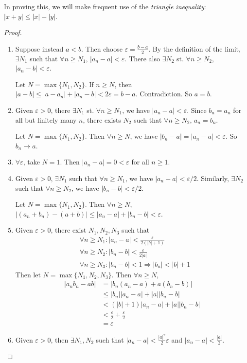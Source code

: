 \documentclass[a4paper]{article}
\begin{document}
In proving this, we will make frequent use of the \emph{triangle inequality}: $|x + y|\leq |x| + |y|$.
\begin{proof}\leavevmode
  \begin{enumerate}
    \item Suppose instead $a < b$. Then choose $\varepsilon = \frac{b - a}{2}$. By the definition of the limit, $\exists N_1$ such that $\forall n\geq N_1$, $|a_n - a| < \varepsilon$. There also $\exists N_2$ st. $\forall n\geq N_2$, $|a_n - b| < \varepsilon$.

      Let $N = \max\{N_1, N_2\}$. If $n\geq N$, then $|a - b| \leq |a - a_n| + |a_n - b| < 2\varepsilon = b - a.$
      Contradiction. So $a = b$.
    \item Given $\varepsilon > 0$, there $\exists N_1$ st. $\forall n\geq N_1$, we have $|a_n - a| < \varepsilon$. Since $b_n = a_n$ for all but finitely many $n$, there exists $N_2$ such that $\forall n\geq N_2$, $a_n = b_n$.

      Let $N = \max\{N_1, N_2\}$. Then $\forall n\geq N$, we have $|b_n - a| = |a_n - a| < \varepsilon$. So $b_n\to a$.
    \item $\forall \varepsilon$, take $N = 1$. Then $|a_n - a| = 0 < \varepsilon$ for all $n \geq 1$.
    \item Given $\varepsilon > 0$, $\exists N_1$ such that $\forall n\geq N_1$, we have $|a_n - a| < \varepsilon/2$. Similarly, $\exists N_2$ such that $\forall n\geq N_2$, we have $|b_n - b| < \varepsilon/2$.

      Let $N = \max\{N_1, N_2\}$. Then $\forall n \geq N$, $|(a_n + b_n) - (a + b)| \leq |a_n - a| + |b_n - b| < \varepsilon$.
    \item Given $\varepsilon > 0$, there exist $N_1, N_2, N_3$ such that
      \begin{align*}
        &\forall n\geq N_1: |a_n - a| < \frac{\varepsilon}{2(|b| + 1)}\\
        &\forall n\geq N_2: |b_n - b| < \frac{\varepsilon}{2|a|}\\
        &\forall n\geq N_3: |b_n - b| < 1 \Rightarrow |b_n| < |b| +1
      \end{align*}
      Then let $N = \max\{N_1, N_2, N_3\}$. Then $\forall n\geq N$,
      \begin{align*}
        |a_nb_n - ab| &= |b_n(a_n - a) + a(b_n - b)|\\
        &\leq |b_n| |a_n - a| + |a||b_n - b|\\
        &< (|b| + 1) |a_n - a| + |a||b_n - b|\\
        &< \frac{\varepsilon}{2} + \frac{\varepsilon}{2}\\
        &= \varepsilon
      \end{align*}
    \item Given $\varepsilon > 0$, then $\exists N_1, N_2$ such that $|a_n - a| < \frac{|a|^2}{2}\varepsilon$ and $|a_n - a| < \frac{|a|}{2}$.


\end{enumerate}
\end{proof}
\end{document}
